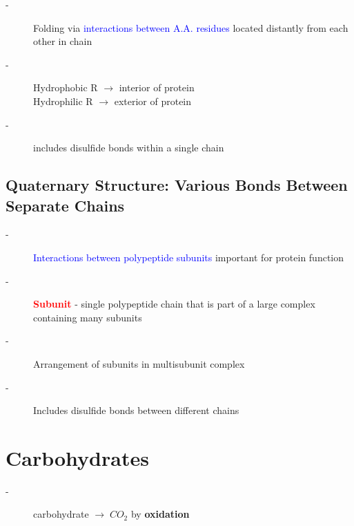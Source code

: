 \documentclass[10pt,a4paper]{report}
\begin{document}
	\begin{description}
		\item[-] Folding via \textcolor{blue}{interactions between A.A. residues} located distantly from each other in chain
		\item[-] Hydrophobic R $\rightarrow$ interior of protein \hfill \\ Hydrophilic R $\rightarrow$ exterior of protein
		\item[-] includes disulfide bonds within a single chain
	\end{description}
	
	\subsection{Quaternary Structure: Various Bonds Between Separate Chains}
	
	\begin{description}
		\item[-] \textcolor{blue}{Interactions between polypeptide subunits} important for protein function
		\item[-] \textcolor{red}{\textbf{Subunit}} - single polypeptide chain that is part of a large complex containing many subunits
		\item[-] Arrangement of subunits in multisubunit complex
		\item[-] Includes disulfide bonds between different chains
	\end{description}
	
	\section{Carbohydrates}
	
	\begin{description}
		\item[-] carbohydrate $\rightarrow \; CO_{2}$ by \textbf{oxidation} 
	\end{description}
	
\end{document}
